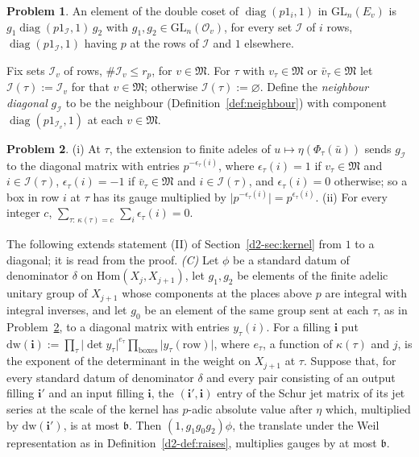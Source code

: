 \documentclass[reqno]{amsart}
\theoremstyle{plain}
\theoremstyle{definition}
\newtheorem{problem}{Problem}[section]
\theoremstyle{remark}
\newcommand{\Oc}{\mathcal O}
\newcommand{\Ic}{\mathcal I}
\newcommand{\Mk}{\mathfrak M}
\begin{document}
\begin{problem}\label{pr:cartan}
An element of the double coset of \(\operatorname{diag}(p1_i, 1)\) in \(\mathrm{GL}_n(E_v)\) is \(g_1 \operatorname{diag}(p 1_{\Ic}, 1)\, g_2\) with \(g_1, g_2 \in \mathrm{GL}_n(\Oc_v)\), for every set \(\Ic\) of \(i\) rows, \(\operatorname{diag}(p1_{\Ic}, 1)\) having \(p\) at the rows of \(\Ic\) and \(1\) elsewhere.
\end{problem}

Fix sets \(\Ic_v\) of rows, \(\#\Ic_v \le r_p\), for \(v \in \Mk\).  For \(\tau\) with \(v_\tau \in \Mk\) or \(\bar v_\tau \in \Mk\) let \(\Ic(\tau) := \Ic_v\) for that \(v \in \Mk\); otherwise \(\Ic(\tau) := \varnothing\).  Define the \emph{neighbour diagonal} \(g_{\Ic}\) to be the neighbour (Definition~\ref{def:neighbour}) with component \(\operatorname{diag}(p1_{\Ic_v}, 1)\) at each \(v \in \Mk\).

\begin{problem}\label{pr:diagonal}
(i) At \(\tau\), the extension to finite adeles of \(u \mapsto \eta(\Phi_\tau(\bar u))\) sends \(g_{\Ic}\) to the diagonal matrix with entries \(p^{-\epsilon_\tau(i)}\), where \(\epsilon_\tau(i) = 1\) if \(v_\tau \in \Mk\) and \(i \in \Ic(\tau)\), \(\epsilon_\tau(i) = -1\) if \(\bar v_\tau \in \Mk\) and \(i \in \Ic(\tau)\), and \(\epsilon_\tau(i) = 0\) otherwise; so a box in row \(i\) at \(\tau\) has its gauge multiplied by \(\lvert p^{-\epsilon_\tau(i)}\rvert = p^{\epsilon_\tau(i)}\).  (ii) For every integer \(c\), \(\sum_{\tau :\, \kappa(\tau) = c}\, \sum_i \epsilon_\tau(i) = 0\).
\end{problem}

The following extends statement (II) of Section~\ref{d2-sec:kernel} from \(1\) to a diagonal; it is read from the proof.  \emph{(C)} Let \(\phi\) be a standard datum of denominator \(\delta\) on \(\mathrm{Hom}(X_j, X_{j+1})\), let \(g_1, g_2\) be elements of the finite adelic unitary group of \(X_{j+1}\) whose components at the places above \(p\) are integral with integral inverses, and let \(g_0\) be an element of the same group sent at each \(\tau\), as in Problem~\ref{pr:diagonal}, to a diagonal matrix with entries \(y_\tau(i)\).  For a filling \(\mathbf i\) put \(\mathrm{dw}(\mathbf i) := \prod_\tau \lvert\det y_\tau\rvert^{e_\tau} \prod_{\text{boxes}} \lvert y_\tau(\text{row})\rvert\), where \(e_\tau\), a function of \(\kappa(\tau)\) and \(j\), is the exponent of the determinant in the weight on \(X_{j+1}\) at \(\tau\).  Suppose that, for every standard datum of denominator \(\delta\) and every pair consisting of an output filling \(\mathbf i'\) and an input filling \(\mathbf i\), the \((\mathbf i',\mathbf i)\) entry of the Schur jet matrix of its jet series at the scale of the kernel has \(p\)-adic absolute value after \(\eta\) which, multiplied by \(\mathrm{dw}(\mathbf i')\), is at most \(\mathfrak b\).  Then \((1, g_1g_0g_2)\phi\), the translate under the Weil representation as in Definition~\ref{d2-def:raises}, multiplies gauges by at most \(\mathfrak b\).
\end{document}

